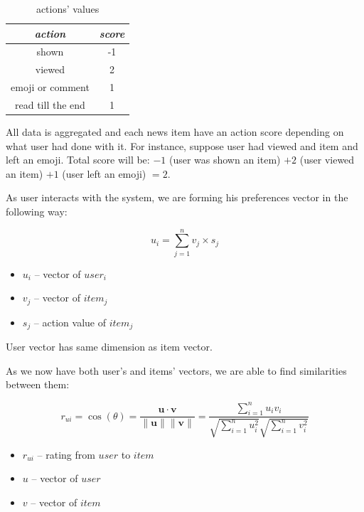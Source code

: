 \documentclass{article}
\begin{document}
\begin{table}[h]
    \centering
    \begin{tabular}{cc}
        \toprule
        \textit{action} & \textit{score} \\
        \midrule
        shown & -1 \\
        viewed & 2 \\
        emoji or comment & 1 \\
        read till the end & 1 \\
        \bottomrule
    \end{tabular}%
    \caption{actions' values}
    \label{tab:action_score}
\end{table}

All data is aggregated and each news item have an action score depending on what user had done with it. For instance, suppose user had viewed and item and left an emoji. Total score will be: $-1$ (user was shown an item) $+2$ (user viewed an item) $+1$ (user left an emoji) $=2$.

As user interacts with the system, we are forming his preferences vector in the following way:

\begin{equation}
    u_i = \sum_{j=1}^{n} v_j \times s_j
\end{equation}

\begin{itemize}
    \item $u_i$ -- vector of $user_i$
    \item $v_j$ -- vector of $item_j$
    \item $s_j$ -- action value of $item_j$
\end{itemize}

User vector has same dimension as item vector.


As we now have both user's and items' vectors, we are able to find similarities between them:


\begin{equation}
    r_{ui}=\cos (\theta)=\frac{\mathbf{u} \cdot \mathbf{v}}{\|\mathbf{u}\|\|\mathbf{v}\|}=\frac{\sum_{i=1}^{n} u_{i} v_{i}}{\sqrt{\sum_{i=1}^{n} u_{i}^{2}} \sqrt{\sum_{i=1}^{n} v_{i}^{2}}}
\end{equation}

\begin{itemize}
    \item $r_{ui}$ -- rating from $user$ to $item$
    \item $u$ -- vector of $user$
    \item $v$ -- vector of $item$
\end{itemize}
\end{document}
